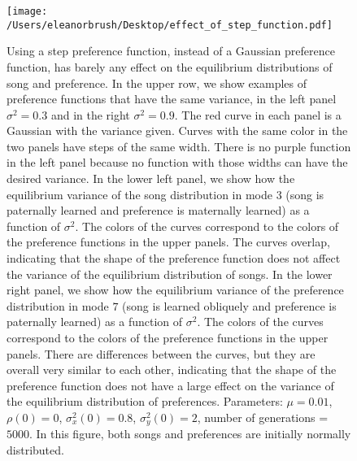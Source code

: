 \documentclass{article}
\begin{document}
\begin{figure}
\texttt{[image: /Users/eleanorbrush/Desktop/effect\_of\_step\_function.pdf]}
\caption{\label{effect_of_step_function} Using a step preference function, instead of a Gaussian preference function, has barely any effect on the equilibrium distributions of song and preference. In the upper row, we show examples of preference functions that have the same variance, in the left panel $\sigma^2=0.3$ and in the right $\sigma^2=0.9$. The red curve in each panel is a Gaussian with the variance given. Curves with the same color in the two panels have steps of the same width. There is no purple function in the left panel because no function with those widths can have the desired variance. In the lower left panel, we show how the equilibrium variance of the song distribution in mode $3$ (song is paternally learned and preference is maternally learned) as a function of $\sigma^2$. The colors of the curves correspond to the colors of the preference functions in the upper panels. The curves overlap, indicating that the shape of the preference function does not affect the variance of the equilibrium distribution of songs. In the lower right panel, we show how the equilibrium variance of the preference distribution in mode $7$ (song is learned obliquely and preference is paternally learned) as a function of $\sigma^2$. The colors of the curves correspond to the colors of the preference functions in the upper panels. There are differences between the curves, but they are overall very similar to each other, indicating that the shape of the preference function does not have a large effect on the variance of the equilibrium distribution of preferences. Parameters: $\mu=0.01$, $\rho(0)=0$, $\sigma_x^2(0)=0.8$, $\sigma_y^2(0)=2$, number of generations = $5000$. In this figure, both songs and preferences are initially normally distributed.}
\end{figure}
\end{document}
